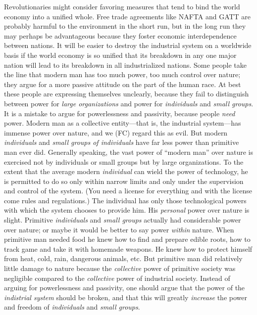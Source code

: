  Revolutionaries might consider favoring measures that tend to bind the world economy into a unified whole. Free trade agreements like NAFTA and GATT are probably harmful to the environment in the short run, but in the long run they may perhaps be advantageous because they foster economic interdependence between nations. It will be easier to destroy the industrial system on a worldwide basis if the world economy is so unified that its breakdown in any one major nation will lead to its breakdown in all industrialized nations.
 Some people take the line that modern man has too much power, too much control over nature; they argue for a more passive attitude on the part of the human race. At best these people are expressing themselves unclearly, because they fail to distinguish between power for {\em large organizations} and power for {\em individuals} and {\em small groups}. It is a mistake to argue for powerlessness and passivity, because people {\em need} power. Modern man as a collective entity—that is, the industrial system—has immense power over nature, and we (FC) regard this as evil. But modern {\em individuals} and {\em small groups of individuals} have far less power than primitive man ever did. Generally speaking, the vast power of “modern man” over nature is exercised not by individuals or small groups but by large organizations. To the extent that the average modern {\em individual} can wield the power of technology, he is permitted to do so only within narrow limits and only under the supervision and control of the system. (You need a license for everything and with the license come rules and regulations.) The individual has only those technological powers with which the system chooses to provide him. His {\em personal} power over nature is slight.
 Primitive {\em individuals} and {\em small groups} actually had considerable power over nature; or maybe it would be better to say power {\em within} nature. When primitive man needed food he knew how to find and prepare edible roots, how to track game and take it with homemade weapons. He knew how to protect himself from heat, cold, rain, dangerous animals, etc. But primitive man did relatively little damage to nature because the {\em collective} power of primitive society was negligible compared to the {\em collective} power of industrial society.
 Instead of arguing for powerlessness and passivity, one should argue that the power of the {\em indistrial system} should be broken, and that this will greatly {\em increase} the power and freedom of {\em individuals} and {\em small groups}.
